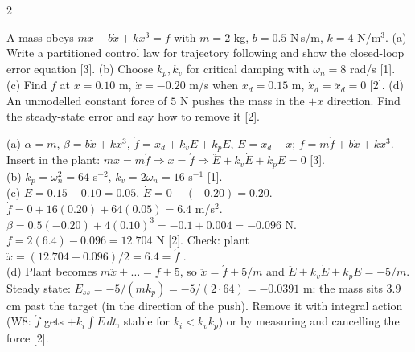 \begin{multicols}{2}
\begin{examq}
A mass obeys $m\ddot x+b\dot x+kx^3=f$ with $m=2$ kg, $b=0.5$ N\,s/m, $k=4$ N/m$^3$. (a) Write a partitioned control law for trajectory following and show the closed-loop error equation [3]. (b) Choose $k_p,k_v$ for critical damping with $\omega_n=8$ rad/s [1]. (c) Find $f$ at $x=0.10$ m, $\dot x=-0.20$ m/s when $x_d=0.15$ m, $\dot x_d=\ddot x_d=0$ [2]. (d) An unmodelled constant force of $5$ N pushes the mass in the $+x$ direction. Find the steady-state error and say how to remove it [2].
\end{examq}
\begin{examq}[EQ1: solution]
\solution
(a) $\alpha=m$, $\beta=b\dot x+kx^3$, $\acute f=\ddot x_d+k_v\dot E+k_pE$, $E=x_d-x$; $f=m\acute f+b\dot x+kx^3$. Insert in the plant: $m\ddot x=m\acute f\Rightarrow\ddot x=\acute f\Rightarrow\boxed{\ddot E+k_v\dot E+k_pE=0}$ [3].\\
(b) $k_p=\omega_n^2=64$ s$^{-2}$, $k_v=2\omega_n=16$ s$^{-1}$ [1].\\
(c) $E=0.15-0.10=0.05$, $\dot E=0-(-0.20)=0.20$. $\acute f=0+16(0.20)+64(0.05)=6.4$ m/s$^2$. $\beta=0.5(-0.20)+4(0.10)^3=-0.1+0.004=-0.096$ N. $f=2(6.4)-0.096=\boxed{12.704\text{ N}}$ [2]. Check: plant $\ddot x=(12.704+0.096)/2=6.4=\acute f$ \checkmark.\\
(d) Plant becomes $m\ddot x+\dots=f+5$, so $\ddot x=\acute f+5/m$ and $\ddot E+k_v\dot E+k_pE=-5/m$. Steady state: $E_{ss}=-5/(mk_p)=-5/(2\cdot64)=\boxed{-0.0391\text{ m}}$: the mass sits $3.9$ cm past the target (in the direction of the push). Remove it with integral action (W8: $\acute f$ gets $+k_i\!\int\!E\,dt$, stable for $k_i<k_vk_p$) or by measuring and cancelling the force [2]. \chk
\end{examq}


\end{multicols}
